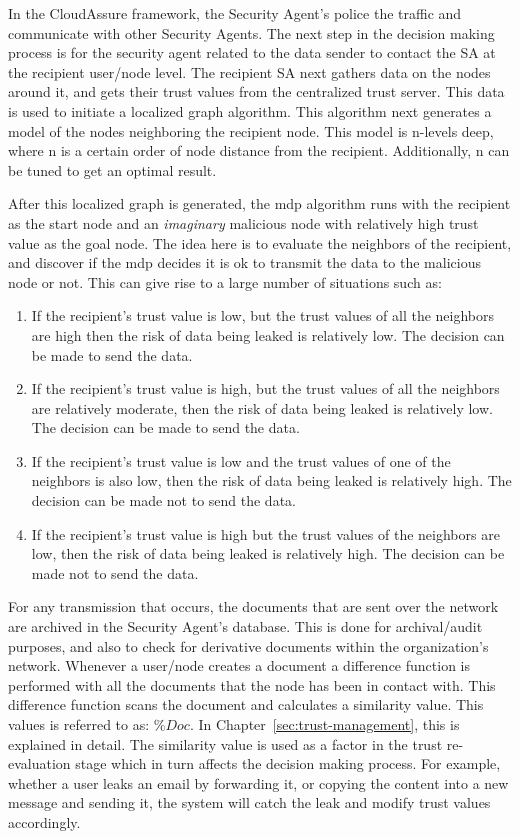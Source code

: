 In the CloudAssure framework, the Security Agent's police the traffic and communicate with other Security Agents. 
The next step in the decision making process is for the security agent related to the data sender
to contact the SA at the recipient user/node level. The recipient SA next
gathers data on the nodes around it, and gets their trust values from the
centralized trust server. This data is used to initiate a localized graph
algorithm. This algorithm next generates a model of the nodes neighboring the
recipient node. This model is n-levels deep, where n is a certain order of node
distance from the recipient. Additionally, n can be tuned to get an optimal result.

After this localized graph is generated, the \gls{mdp} algorithm runs with
the recipient as the start node and an \emph{imaginary} malicious node with
relatively high trust value as the goal node. The idea here is to evaluate
the neighbors of the recipient, and discover if the \gls{mdp} decides it is ok to
transmit the data to the malicious node or not. This can give rise to
a large number of situations such as:
\begin{enumerate}
    \item If the recipient's trust value is low, but the trust values of all the
        neighbors are high then the risk of data being leaked is relatively low. The
        decision can be made to send the data.
    \item If the recipient's trust value is high, but the trust values of all the
        neighbors are relatively moderate, then the risk of data being leaked is
        relatively low. The decision can be made to send the data.
    \item If the recipient's trust value is low and the trust values of one of the
        neighbors is also low, then the risk of data being leaked is relatively
        high. The decision can be made not to send the data.
    \item If the recipient's trust value is high but the trust values of the neighbors
are low, then the risk of data being leaked is relatively high. The decision
can be made not to send the data.  
\end{enumerate}
For any transmission that occurs, the
documents that are sent over the network are archived in the Security Agent's 
database. This is done for archival/audit purposes, and also to check for
derivative documents within the organization's network. Whenever a user/node creates
a document a difference function is performed with all the documents that the node
has been in contact with. This difference function scans the document and
calculates a similarity value. This values is referred to as: \(\%Doc\). In
Chapter~\ref{sec:trust-management}, this is explained in detail. The similarity value is used as a factor in
the trust re-evaluation stage which in turn affects the decision making
process. For example, whether a user leaks an email by forwarding it, or
copying the content into a new message and sending it, the system will catch
the leak and modify trust values accordingly.
